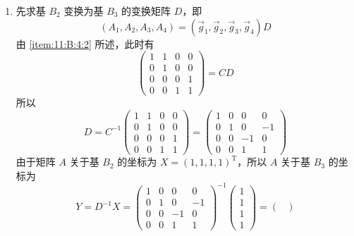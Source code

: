 \begin{exercise}
\begin{exgroup}
\begin{answer}
\begin{enumerate}
                \item 先求基 $ B_2 $ 变换为基 $ B_3 $ 的变换矩阵 $ D $，即
                      \[ (A_1, A_2, A_3, A_4) = (\vec{g}_1, \vec{g}_2, \vec{g}_3, \vec{g}_4) D \]
                      由 \ref*{item:11:B:4:2} 所述，此时有
                      \[ \begin{pmatrix}
                              1 & 1 & 0 & 0 \\
                              0 & 1 & 0 & 0 \\
                              0 & 0 & 0 & 1 \\
                              0 & 0 & 1 & 1
                          \end{pmatrix} = CD \]
                      所以
                      \[ D = C^{-1} \begin{pmatrix}
                              1 & 1 & 0 & 0 \\
                              0 & 1 & 0 & 0 \\
                              0 & 0 & 0 & 1 \\
                              0 & 0 & 1 & 1
                          \end{pmatrix} = \begin{pmatrix}
                              1 & 0 & 0  & 0  \\
                              0 & 1 & 0  & -1 \\
                              0 & 0 & -1 & 0  \\
                              0 & 0 & 1  & 1
                          \end{pmatrix} \]
                      由于矩阵 $ A $ 关于基 $ B_2 $ 的坐标为 $ X = (1, 1, 1, 1)^{\mathrm{T}} $，所以 $ A $ 关于基 $ B_3 $ 的坐标为
                      \[ Y = D^{-1} X = \begin{pmatrix}
                              1 & 0 & 0  & 0  \\
                              0 & 1 & 0  & -1 \\
                              0 & 0 & -1 & 0  \\
                              0 & 0 & 1  & 1
                          \end{pmatrix}^{-1} \begin{pmatrix} 1 \\ 1 \\ 1 \\ 1 \end{pmatrix} = \begin{pmatrix}

\end{pmatrix}\]
\end{enumerate}
\end{answer}
\end{exgroup}
\end{exercise}

